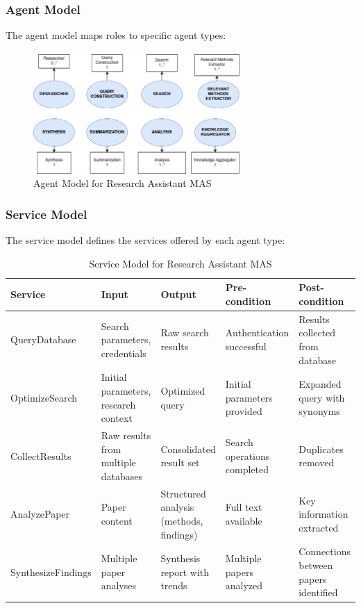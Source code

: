 \documentclass[11pt,a4paper]{article}
\begin{document}
\subsubsection{Agent Model}
The agent model maps roles to specific agent types:

\begin{figure}[H]
    \centering
    \includegraphics[width=0.7\textwidth]{images/agent-model.png}
    \caption{Agent Model for Research Assistant MAS}
    \label{fig:agent-model}
\end{figure}

\subsubsection{Service Model}
The service model defines the services offered by each agent type:

\begin{table}[H]
    \centering
    \begin{tabular}{|p{2.5cm}|p{3cm}|p{2.5cm}|p{3cm}|p{3cm}|}
    \hline
    \textbf{Service} & \textbf{Input} & \textbf{Output} & \textbf{Pre-condition} & \textbf{Post-condition} \\
    \hline
    QueryDatabase & Search parameters, credentials & Raw search results & Authentication successful & Results collected from database \\
    \hline
    OptimizeSearch & Initial parameters, research context & Optimized query & Initial parameters provided & Expanded query with synonyms \\
    \hline
    CollectResults & Raw results from multiple databases & Consolidated result set & Search operations completed & Duplicates removed \\
    \hline
    AnalyzePaper & Paper content & Structured analysis (methods, findings) & Full text available & Key information extracted \\
    \hline
    SynthesizeFindings & Multiple paper analyses & Synthesis report with trends & Multiple papers analyzed & Connections between papers identified \\
    \hline
    \end{tabular}
    \caption{Service Model for Research Assistant MAS}
    \label{tab:service-model}
\end{table}
\end{document}
